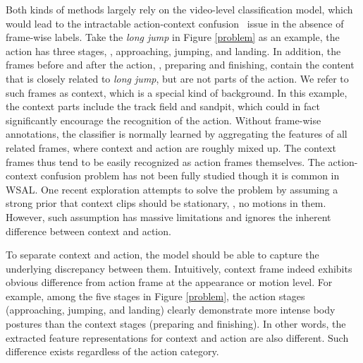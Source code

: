 \documentclass[10pt,twocolumn,letterpaper]{article}
\begin{document}
Both kinds of methods largely rely on the video-level classification model, which would lead to the intractable action-context confusion~\cite{liu2019completeness} issue in the absence of frame-wise labels.
Take the \emph{long jump} in Figure \ref{problem} as an example, the action has three stages, \ie, approaching, jumping, and landing.
In addition, the frames before and after the action, \ie, preparing and finishing, contain the content that is closely related to \emph{long jump}, but are not parts of the action.
We refer to such frames as context, which is a special kind of background.
In this example, the context parts include the track field and sandpit, which could in fact significantly encourage the recognition of the action.
Without frame-wise annotations, the classifier is normally learned by aggregating the features of all related frames, where context and action are roughly mixed up.
The context frames thus tend to be easily recognized as action frames themselves.
The action-context confusion problem has not been fully studied though it is common in WSAL.
One recent exploration \cite{liu2019completeness} attempts to solve the problem by assuming a strong prior that context clips should be stationary, \ie, no motions in them.
However, such assumption has massive limitations and ignores the inherent difference between context and action.






To separate context and action, the model should be able to capture the underlying discrepancy between them.
Intuitively, context frame indeed exhibits obvious difference from action frame at the appearance or motion level.
For example, among the five stages in Figure \ref{problem}, the action stages (approaching, jumping, and landing) clearly demonstrate more intense body postures than the context stages (preparing and finishing).
In other words, the extracted feature representations for context and action are also different.
Such difference exists regardless of the action category.
\end{document}
